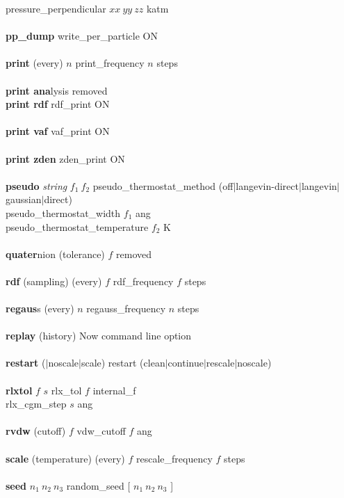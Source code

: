 \begin{tabbing}
\> \> pressure\_perpendicular $xx~yy~zz$ katm \\\\
\>    {\bf pp\_dump} \> write\_per\_particle ON \\\\
\>    {\bf print} (every) $n$ \> print\_frequency $n$ steps \\\\
\>    {\bf print ana}lysis \> removed \\
\>    {\bf print rdf} \> rdf\_print ON \\\\
\>    {\bf print vaf} \> vaf\_print ON \\\\
\>    {\bf print zden} \> zden\_print ON \\\\
\>    {\bf pseudo}  {\em string} $f_{1}~f_{2}$ \> pseudo\_thermostat\_method (off$|$langevin-direct$|$langevin$|$gaussian$|$direct) \\
\> \> pseudo\_thermostat\_width $f_{1}$ ang \\
\> \> pseudo\_thermostat\_temperature $f_{2}$ K \\\\
\>    {\bf quater}nion (tolerance) $f$ \> removed \\\\
\>    {\bf rdf} (sampling) (every) $f$ \> rdf\_frequency $f$ steps \\\\
\>    {\bf regaus}s (every) $n$ \> regauss\_frequency $n$ steps \\\\
\>    {\bf replay} (history) \> Now command line option \\\\
\>    {\bf restart} ($|$noscale$|$scale) \> restart (clean$|$continue$|$rescale$|$noscale) \\\\
\>    {\bf rlxtol} $f$ $s$ \> rlx\_tol $f$ internal\_f \\
\> \> rlx\_cgm\_step $s$ ang \\\\
\>    {\bf rvdw} (cutoff) $f$ \> vdw\_cutoff $f$ ang \\\\
\>    {\bf scale} (temperature) (every) $f$ \> rescale\_frequency $f$ steps \\\\
\>    {\bf seed} $n_{1}~n_{2}~n_{3}$ \> random\_seed [ $n_{1}~n_{2}~n_{3}$ ] \\\\

\end{tabbing}
